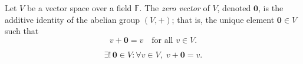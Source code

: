 \begin{definition}
\label{def:zero-vector}
Let $V$ be a vector space over a field $\mathbb{F}$.
The \emph{zero vector} of $V$, denoted $\mathbf{0}$, is the additive identity
of the abelian group $(V,+)$; that is, the unique element $\mathbf{0} \in V$
such that
\[
v + \mathbf{0} = v
\quad \text{for all } v \in V.
\]
\end{definition}

\begin{remark*}
\[ \exists!\, \mathbf{0}\in V: \forall v\in V,\; v+\mathbf{0}=v. \]
\end{remark*}

\begin{remark*}[Flash]
\end{remark*}